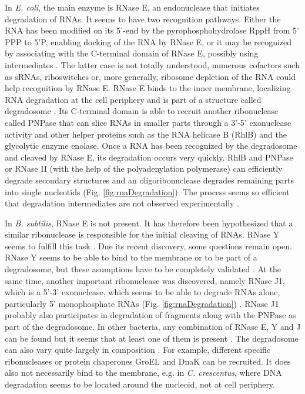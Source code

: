 In \textit{E. coli}, the main enzyme is RNase E, an endonuclease that initiates degradation of RNAs. It seems to have two recognition pathways. Either the RNA has been modified on its 5'-end by the pyrophosphohydrolase RppH from 5' PPP to 5'P, enabling docking of the RNA by RNase E, or it may be recognized by associating with the C-terminal domain of RNase E, possibly using intermediates \citep{laalami_initiation_2013}. The latter case is not totally understood, numerous cofactors such as sRNAs, riboswitches or, more generally, ribosome depletion of the RNA could help recognition by RNase E. RNase E binds to the inner membrane, localizing RNA degradation at the cell periphery and is part of a structure called degradosome \citep{bechhofer_bacillus_2011,laalami_initiation_2013,bandyra_social_2013}. Its C-terminal domain is able to recruit another ribonuclease called PNPase that can slice RNAs in smaller parts through a 3'-5' exonuclease activity and other helper proteins such as the RNA helicase B (RhlB) and the glycolytic enzyme enolase. Once a RNA has been recognized by the degradosome and cleaved by RNase E, its degradation occurs very quickly. RhlB and PNPase or RNase II (with the help of the polyadenylation polymerase) can efficiently degrade secondary structures and an oligoribonuclease degrades remaining parts into single nucleotids (Fig. \ref{fig:rnaDegradation}). The process seems so efficient that degradation intermediates are not observed experimentally \citep{hambraeus_genome-wide_2003}.

In \textit{B. subtilis}, RNase E is not present. It has therefore been hypothesized that a similar ribonuclease is responsible for the initial cleaving of RNAs. RNase Y seems to fulfill this task \citep{lehnik-habrink_rna_2012,bechhofer_bacillus_2011,laalami_initiation_2013}. Due its recent discovery, some questions remain open. RNase Y seems to be able to bind to the membrane or to be part of a degradosome, but these asumptions have to be completely validated \citep{laalami_initiation_2013}. At the same time, another important ribonuclease was discovered, namely RNase J1, which is a 5'-3' exonuclease, which seems to be able to degrade RNAs alone, particularly 5' monophosphate RNAs (Fig. \ref{fig:rnaDegradation}) \citep{lehnik-habrink_rna_2012,bechhofer_bacillus_2011,laalami_initiation_2013}. RNase J1 probably also participates in degradation of fragments along with the PNPase as part of the degradosome. In other bacteria, any combination of RNase E, Y and J can be found but it seems that at least one of them is present \citep{archambault_measurements_2013}. The degradosome can also vary quite largely in composition \citep{laalami_initiation_2013}. For example, different specific ribonucleases or protein chaperones GroEL and DnaK can be recruited. It does also not necessarily bind to the membrane, e.g. in \textit{C. crescentus}, where DNA degradation seems to be located around the nucleoid, not at cell periphery.

